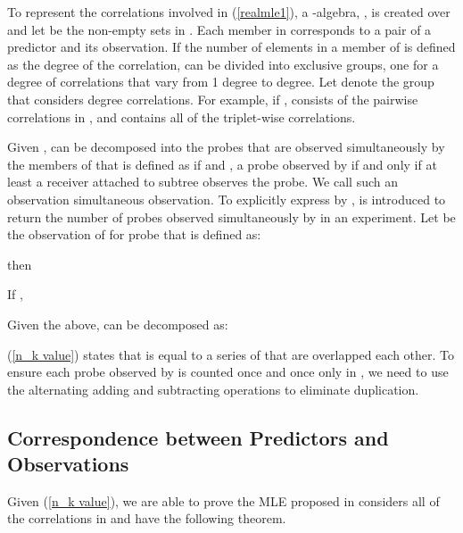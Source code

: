 \documentclass[10pt,onecolumn]{IEEEtran}
\begin{document}
To represent the correlations involved in (\ref{realmle1}),
 a -algebra, , is created over  and  let  be the non-empty sets in . Each member in  corresponds to a pair of a predictor and its observation.  If  the number of elements in a member of  is defined as the degree of the correlation,  can be divided into  exclusive groups, one for
 a degree of correlations that vary from 1 degree to  degree. Let  denote the group that considers  degree correlations. For example, if ,  consists of the pairwise correlations in , and  contains all of the triplet-wise correlations.


Given ,   can be decomposed into the probes that are observed simultaneously by the members of   that is defined as if  and , a probe observed by   if and only if at least a receiver attached to subtree  observes the probe. We call such an observation simultaneous observation.
 To explicitly express  by ,   is introduced to return  the number of probes observed simultaneously by   in an experiment.
Let  be the observation of  for probe  that is defined as:

then

If ,

Given the above,  can be decomposed as:


(\ref{n_k value}) states that  is equal to a series of  that are overlapped each other. To ensure each probe observed by  is counted once and once only in , we need to use the alternating adding and subtracting operations to eliminate duplication.


\subsection{Correspondence between Predictors and Observations}

Given  (\ref{n_k value}), we are able to prove the MLE proposed in \cite{CDHT99} considers all of the correlations in  and have the following theorem.
\end{document}
